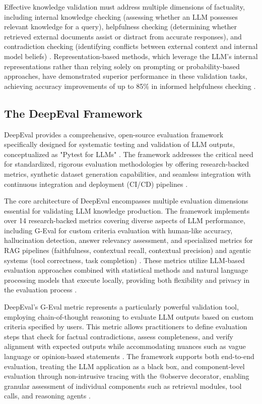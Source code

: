 Effective knowledge validation must address multiple dimensions of factuality, including internal knowledge checking (assessing whether an LLM possesses relevant knowledge for a query), helpfulness checking (determining whether retrieved external documents assist or distract from accurate responses), and contradiction checking (identifying conflicts between external context and internal model beliefs) \cite{zeng2025knowledge}. Representation-based methods, which leverage the LLM's internal representations rather than relying solely on prompting or probability-based approaches, have demonstrated superior performance in these validation tasks, achieving accuracy improvements of up to 85\% in informed helpfulness checking \cite{zeng2025knowledge}.

\subsection{The DeepEval Framework}

DeepEval provides a comprehensive, open-source evaluation framework specifically designed for systematic testing and validation of LLM outputs, conceptualized as "Pytest for LLMs" \cite{deepeval2023}. The framework addresses the critical need for standardized, rigorous evaluation methodologies by offering research-backed metrics, synthetic dataset generation capabilities, and seamless integration with continuous integration and deployment (CI/CD) pipelines \cite{deepeval2023}.

The core architecture of DeepEval encompasses multiple evaluation dimensions essential for validating LLM knowledge production. The framework implements over 14 research-backed metrics covering diverse aspects of LLM performance, including G-Eval for custom criteria evaluation with human-like accuracy, hallucination detection, answer relevancy assessment, and specialized metrics for RAG pipelines (faithfulness, contextual recall, contextual precision) and agentic systems (tool correctness, task completion) \cite{deepeval2023}. These metrics utilize LLM-based evaluation approaches combined with statistical methods and natural language processing models that execute locally, providing both flexibility and privacy in the evaluation process \cite{deepeval2023}.

DeepEval's G-Eval metric represents a particularly powerful validation tool, employing chain-of-thought reasoning to evaluate LLM outputs based on custom criteria specified by users. This metric allows practitioners to define evaluation steps that check for factual contradictions, assess completeness, and verify alignment with expected outputs while accommodating nuances such as vague language or opinion-based statements \cite{deepeval2023}. The framework supports both end-to-end evaluation, treating the LLM application as a black box, and component-level evaluation through non-intrusive tracing with the @observe decorator, enabling granular assessment of individual components such as retrieval modules, tool calls, and reasoning agents \cite{deepeval2023}.


